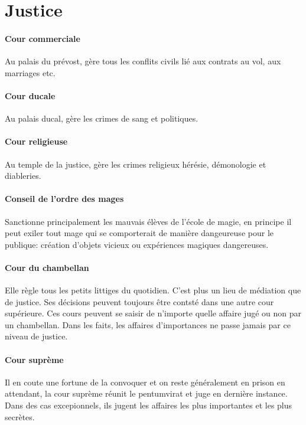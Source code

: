 \section{Justice}
  \paragraph{Cour commerciale}
    Au palais du prévost, gère tous les conflits civils lié aux contrats
    au vol, aux marriages etc. \\
  \paragraph{Cour ducale}
    Au palais ducal, gère les crimes de sang et politiques. \\
  \paragraph{Cour religieuse}
    Au temple de la justice, gère les crimes religieux hérésie, démonologie
    et diableries. \\
  \paragraph{Conseil de l'ordre des mages}
    Sanctionne principalement les mauvais élèves de l'école de magie, en
    principe il peut exiler tout mage qui se comporterait de manière 
    dangeureuse pour le publique: création d'objets vicieux ou expériences 
    magiques dangereuses. \\
  \paragraph{Cour du chambellan }
    Elle règle tous les petits littiges du quotidien. C'est 
    plus un lieu de médiation que de justice. Ses décisions peuvent
    toujours être contsté dans une autre cour supérieure. Ces cours peuvent
    se saisir de n'importe quelle affaire jugé ou non par un chambellan.
    Dans les faits, les affaires d'importances ne passe jamais par ce 
    niveau de justice. \\
  \paragraph{Cour suprème}
    Il en coute une fortune de la convoquer et on reste généralement en 
    prison en attendant, la cour suprème réunit le pentumvirat et juge
    en dernière instance. Dans des cas excepionnels, ils jugent les 
    affaires les plus importantes et les plus secrètes. \\

